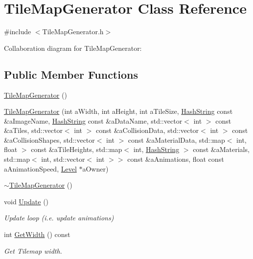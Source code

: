 \hypertarget{classTileMapGenerator}{}\section{Tile\+Map\+Generator Class Reference}
\label{classTileMapGenerator}


{\ttfamily \#include $<$Tile\+Map\+Generator.\+h$>$}



Collaboration diagram for Tile\+Map\+Generator\+:
\subsection*{Public Member Functions}
\begin{DoxyCompactItemize}
\item 
\hyperlink{classTileMapGenerator_ab1a10fc2b40cce1e449a2fefe5725dfd}{Tile\+Map\+Generator} ()
\item 
\hyperlink{classTileMapGenerator_a7a7e6112a0e1424f480d86bd58a9f270}{Tile\+Map\+Generator} (int a\+Width, int a\+Height, int a\+Tile\+Size, \hyperlink{classHashString}{Hash\+String} const \&a\+Image\+Name, \hyperlink{classHashString}{Hash\+String} const \&a\+Data\+Name, std\+::vector$<$ int $>$ const \&a\+Tiles, std\+::vector$<$ int $>$ const \&a\+Collision\+Data, std\+::vector$<$ int $>$ const \&a\+Collision\+Shapes, std\+::vector$<$ int $>$ const \&a\+Material\+Data, std\+::map$<$ int, float $>$ const \&a\+Tile\+Heights, std\+::map$<$ int, \hyperlink{classHashString}{Hash\+String} $>$ const \&a\+Materials, std\+::map$<$ int, std\+::vector$<$ int $>$$>$ const \&a\+Animations, float const a\+Animation\+Speed, \hyperlink{classLevel}{Level} $\ast$a\+Owner)
\item 
\hyperlink{classTileMapGenerator_ac1b30222d9367e0892ce32d9beba66a3}{$\sim$\+Tile\+Map\+Generator} ()
\item 
void \hyperlink{classTileMapGenerator_ad1092415748f74dc618e99f5f72b01c8}{Update} ()
\begin{DoxyCompactList}\small\item\em Update loop (i.\+e. update animations) \end{DoxyCompactList}\item 
int \hyperlink{classTileMapGenerator_abd5c9dcfaebf7dd27c6e4e2de480a0cf}{Get\+Width} () const 
\begin{DoxyCompactList}\small\item\em Get Tilemap width. \end{DoxyCompactList}\item 
$$
\end{DoxyCompactItemize}
